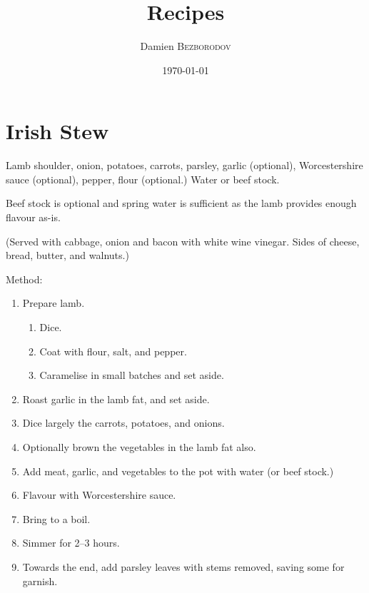 \documentclass[a4paper,1em]{article}
\title{
    Recipes
}
\date{\today}
\author{
    Damien \textsc{Bezborodov}
}
\begin{document}
\maketitle

\tableofcontents

\newpage
\section{Irish Stew}

Lamb shoulder, onion, potatoes, carrots, parsley, garlic (optional), Worcestershire sauce (optional), pepper, flour (optional.) Water or beef stock.

Beef stock is optional and spring water is sufficient as the lamb provides enough flavour as-is.

(Served with cabbage, onion and bacon with white wine vinegar. Sides of cheese, bread, butter, and walnuts.)

Method:


\begin{enumerate}
    \item Prepare lamb.
    \begin{enumerate}
        \item Dice.
        \item Coat with flour, salt, and pepper.
        \item Caramelise in small batches and set aside.
    \end{enumerate}
    \item Roast garlic in the lamb fat, and set aside.
    \item Dice largely the carrots, potatoes, and onions.
    \item Optionally brown the vegetables in the lamb fat also.
    \item Add meat, garlic, and vegetables to the pot with water (or beef stock.)
    \item Flavour with Worcestershire sauce.
    \item Bring to a boil.
    \item Simmer for 2–3 hours.
    \item Towards the end, add parsley leaves with stems removed, saving some for garnish.
\end{enumerate}
\end{document}
